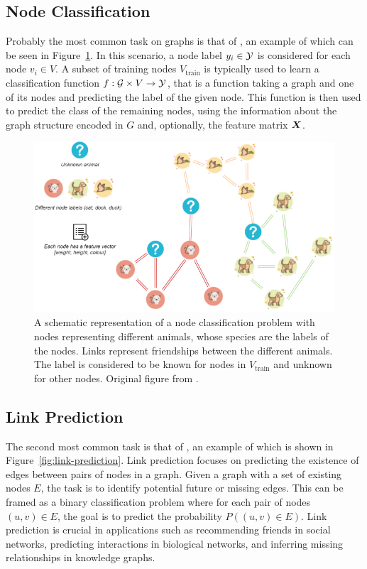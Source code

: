 \subsection{Node Classification}

Probably the most common task on graphs is that of , an example of which can be seen in Figure~\ref{fig:node-classification}. In this scenario, a node label \( y_i \in \mathcal{Y} \) is considered for each node \( v_i \in V \). A subset of training nodes \( V_\mathrm{train} \) is typically used to learn a classification function \( f : \mathcal{G} \times V \to \mathcal{Y} \), that is a function taking a graph and one of its nodes and predicting the label of the given node. This function is then used to predict the class of the remaining nodes, using the information about the graph structure encoded in \( G \) and, optionally, the feature matrix \( \bm{X} \). 

\begin{figure}
	\includegraphics[width=\linewidth]{images/graph-tasks/node-classification.png}
	\caption{A schematic representation of a node classification problem with nodes representing different animals, whose species are the labels of the nodes. Links represent friendships between the different animals. The label is considered to be known for nodes in \( V_\mathrm{train} \) and unknown for other nodes. Original figure from \cite{kubara_machine_2020}.}
	\label{fig:node-classification}
\end{figure}

\subsection{Link Prediction}

The second most common task is that of , an example of which is shown in Figure~\ref{fig:link-prediction}. Link prediction focuses on predicting the existence of edges between pairs of nodes in a graph. Given a graph with a set of existing nodes \( E \), the task is to identify potential future or missing edges. This can be framed as a binary classification problem where for each pair of nodes \( (u, v) \in E \), the goal is to predict the probability \( P((u, v) \in E) \). Link prediction is crucial in applications such as recommending friends in social networks, predicting interactions in biological networks, and inferring missing relationships in knowledge graphs.  

